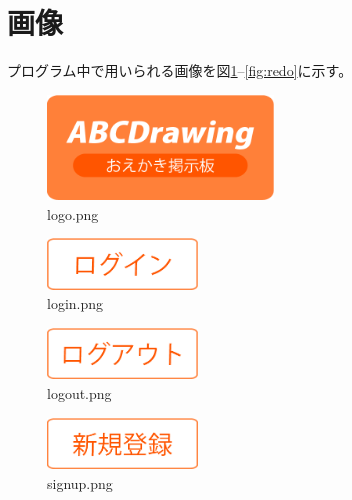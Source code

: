 \documentclass[a4j,titlepage]{jsarticle}
\begin{document}







\section{画像}
プログラム中で用いられる画像を図\ref{fig:logo}--\ref{fig:redo}に示す。

\begin{figure}[H]
  \centering
  \includegraphics[width=6cm]{../public/image/logo.png}
  \caption{logo.png}
  \label{fig:logo}
\end{figure}

\begin{figure}[H]
  \centering
  \includegraphics[width=4cm]{../public/image/login.png}
  \caption{login.png}
  \label{fig:login}
\end{figure}

\begin{figure}[H]
  \centering
  \includegraphics[width=4cm]{../public/image/logout.png}
  \caption{logout.png}
  \label{fig:logout}
\end{figure}

\begin{figure}[H]
  \centering
  \includegraphics[width=4cm]{../public/image/signup.png}
  \caption{signup.png}
  \label{fig:signup}
\end{figure}
\end{document}
